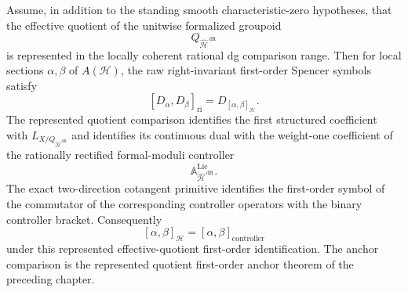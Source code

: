 \begin{theorem}
\label{thm:as-classical-bracket-comparison}
Assume, in addition to the standing smooth characteristic-zero hypotheses,
that the effective quotient of the unitwise formalized groupoid
\[
    Q_{\widehat{\mathcal H}^{\,\mathrm{dR}}}
\]
is represented in the locally coherent rational dg comparison range.  Then
for local sections $\alpha,\beta$ of $A(\mathcal H)$, the raw right-invariant
first-order Spencer symbols satisfy
\[
    [D_\alpha,D_\beta]_{\mathrm{ri}}
    =
    D_{[\alpha,\beta]_{\mathcal H}}.
\]
The represented quotient comparison identifies the first structured
coefficient with
$L_{X/Q_{\widehat{\mathcal H}^{\,\mathrm{dR}}}}$ and identifies its
continuous dual with the weight-one coefficient of the rationally rectified
formal-moduli controller
\[
    \mathbb A_{\widehat{\mathcal H}^{\,\mathrm{dR}}}^{\mathrm{Lie}}.
\]
The exact two-direction cotangent primitive identifies the first-order symbol
of the commutator of the corresponding controller operators with the binary
controller bracket.  Consequently
\[
\boxed{
    [\alpha,\beta]_{\mathcal H}
    =
    [\alpha,\beta]_{\mathrm{controller}}
}
\]
under this represented effective-quotient first-order identification.  The
anchor comparison is the represented quotient first-order anchor theorem of
the preceding chapter.
\end{theorem}

